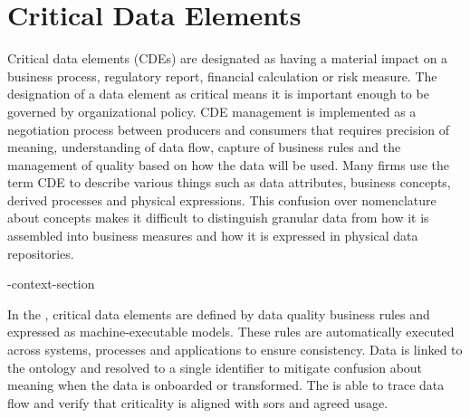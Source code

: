 \section{Critical Data Elements}\label{sec:ekgmm-b-4-5} %

Critical data elements (CDEs) are designated as having a material impact on a business process, regulatory report,
financial calculation or risk measure.
The designation of a data element as critical means it is important enough to be governed by organizational policy.
CDE management is implemented as a negotiation process between producers and consumers that requires
precision of meaning, understanding of data flow, capture of business rules and the management of quality based on
how the data will be used.
Many firms use the term CDE to describe various things such as data attributes, business concepts, derived processes
and physical expressions.
This confusion over nomenclature about concepts makes it difficult to distinguish granular data from how it is
assembled into business measures and how it is expressed in physical data repositories.

\ekgmm-context-section

In the ,
critical data elements are defined by data quality business rules and expressed as
machine-executable models.
These rules are automatically executed across systems, processes and applications to ensure consistency.
Data is linked to the ontology and resolved to a single identifier to mitigate confusion about meaning when the
data is onboarded or transformed.
The  is able to trace data flow and verify that criticality is aligned with \glspl{sor}
and agreed usage.

\kgmmcorequestionssection

